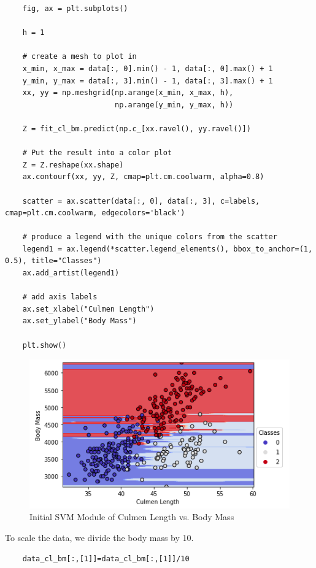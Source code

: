 \documentclass[12pt]{article}
\begin{document}
\begin{verbatim}
    fig, ax = plt.subplots()

    h = 1
    
    # create a mesh to plot in
    x_min, x_max = data[:, 0].min() - 1, data[:, 0].max() + 1
    y_min, y_max = data[:, 3].min() - 1, data[:, 3].max() + 1
    xx, yy = np.meshgrid(np.arange(x_min, x_max, h),
                         np.arange(y_min, y_max, h))
    
    Z = fit_cl_bm.predict(np.c_[xx.ravel(), yy.ravel()])
    
    # Put the result into a color plot
    Z = Z.reshape(xx.shape)
    ax.contourf(xx, yy, Z, cmap=plt.cm.coolwarm, alpha=0.8)
    
    scatter = ax.scatter(data[:, 0], data[:, 3], c=labels, cmap=plt.cm.coolwarm, edgecolors='black')
    
    # produce a legend with the unique colors from the scatter
    legend1 = ax.legend(*scatter.legend_elements(), bbox_to_anchor=(1, 0.5), title="Classes")
    ax.add_artist(legend1)
    
    # add axis labels
    ax.set_xlabel("Culmen Length")
    ax.set_ylabel("Body Mass")
    
    plt.show()    
\end{verbatim}

\begin{figure}[H]
    \centering
    \includegraphics[width=5in]{Figures/penguins/fit_cl_bm.png}
    \caption{Initial SVM Module of Culmen Length vs. Body Mass}
    \label{fig_fit_cl_bm}
\end{figure}

To scale the data, we divide the body mass by 10.

\begin{verbatim}
    data_cl_bm[:,[1]]=data_cl_bm[:,[1]]/10
\end{verbatim}
\end{document}
